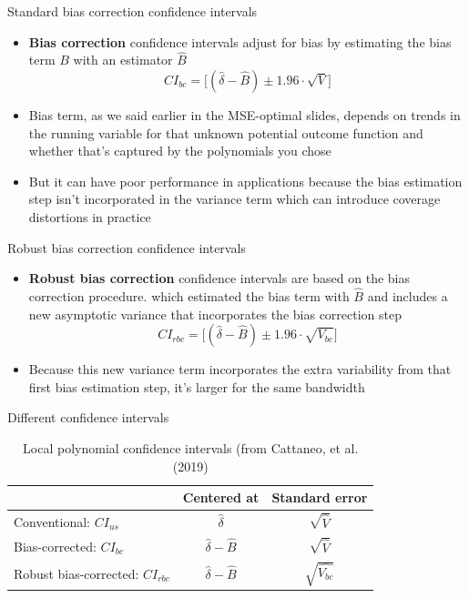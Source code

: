\documentclass{beamer}
\begin{document}
\begin{frame}{Standard bias correction confidence intervals}

\begin{itemize}
\item \textbf{Bias correction} confidence intervals adjust for bias by estimating the bias term $B$ with an estimator $\widehat{B}$  $$CI_{bc}=\bigg [ ( \widehat{\delta} - \widehat{B} ) \pm 1.96 \cdot \sqrt{V} \bigg ]$$
\item Bias term, as we said earlier in the MSE-optimal slides, depends on trends in the running variable for that unknown potential outcome function and whether that's captured by the polynomials you chose
\item But it can have poor performance in applications because the bias estimation step isn't incorporated in the variance term which can introduce coverage distortions in practice
\end{itemize}

\end{frame}


\begin{frame}{Robust bias correction confidence intervals}

\begin{itemize}
\item \textbf{Robust bias correction} confidence intervals are based on the bias correction procedure. which estimated the bias term with $\widehat{B}$ and includes a new asymptotic variance that incorporates the bias correction step  $$CI_{rbc}=\bigg [ ( \widehat{\delta} - \widehat{B} ) \pm 1.96 \cdot \sqrt{V_{bc}} \bigg ]$$
\item Because this new variance term incorporates the extra variability from that first bias estimation step, it's larger for the same bandwidth
\end{itemize}
\end{frame}


\begin{frame}{Different confidence intervals}


\begin{table}[htbp]\centering
\caption{Local polynomial confidence intervals (from Cattaneo, et al. (2019)}
\centering
\begin{tabular}{l*{2}{c}}
\toprule
\multicolumn{1}{l}{\textbf{}}&
\multicolumn{1}{c}{\textbf{Centered at}}&
\multicolumn{1}{c}{\textbf{Standard error}}\\
\midrule
Conventional: $CI_{us}$	& $\widehat{\delta}$	& $\sqrt{\widehat{V}}$ \\
Bias-corrected: $CI_{bc}$	& $\widehat{\delta} - \widehat{B}$	& $\sqrt{\widehat{V}}$ \\
Robust bias-corrected: $CI_{rbc}$	& $\widehat{\delta} - \widehat{B}$	& $\sqrt{\widehat{V_{bc}}}$ \\
\bottomrule
\end{tabular}
\end{table}

\end{frame}
\end{document}

